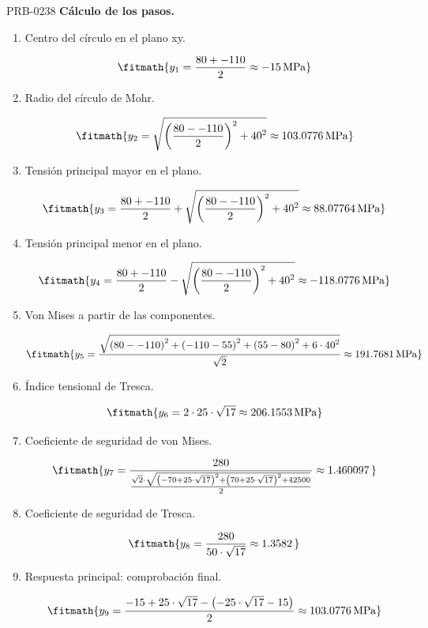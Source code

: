 \begin{studiumworked}{PRB-0238}
\textbf{Cálculo de los pasos.}

\begin{enumerate}

\item Centro del círculo en el plano xy.

\[\fitmath{y_{1}=\frac{80+-110}{2}\approx -15\,\mathrm{MPa}}\]

\item Radio del círculo de Mohr.

\[\fitmath{y_{2}=\sqrt{{\left(\frac{80--110}{2}\right)}^{2}+{40}^{2}}\approx 103.0776\,\mathrm{MPa}}\]

\item Tensión principal mayor en el plano.

\[\fitmath{y_{3}=\frac{80+-110}{2}+\sqrt{{\left(\frac{80--110}{2}\right)}^{2}+{40}^{2}}\approx 88.07764\,\mathrm{MPa}}\]

\item Tensión principal menor en el plano.

\[\fitmath{y_{4}=\frac{80+-110}{2}-\sqrt{{\left(\frac{80--110}{2}\right)}^{2}+{40}^{2}}\approx -118.0776\,\mathrm{MPa}}\]

\item Von Mises a partir de las componentes.

\[\fitmath{y_{5}=\frac{\sqrt{{\left(80--110\right)}^{2}+{\left(-110-55\right)}^{2}+{\left(55-80\right)}^{2}+6\cdot {40}^{2}}}{\sqrt{2}}\approx 191.7681\,\mathrm{MPa}}\]

\item Índice tensional de Tresca.

\[\fitmath{y_{6}=2\cdot 25\cdot \sqrt{17}\approx 206.1553\,\mathrm{MPa}}\]

\item Coeficiente de seguridad de von Mises.

\[\fitmath{y_{7}=\frac{280}{\frac{\sqrt{2}\cdot \sqrt{{\left(-70+25\cdot \sqrt{17}\right)}^{2}+{\left(70+25\cdot \sqrt{17}\right)}^{2}+42500}}{2}}\approx 1.460097\,}\]

\item Coeficiente de seguridad de Tresca.

\[\fitmath{y_{8}=\frac{280}{50\cdot \sqrt{17}}\approx 1.3582\,}\]

\item Respuesta principal: comprobación final.

\[\fitmath{y_{9}=\frac{-15+25\cdot \sqrt{17}-\left(-25\cdot \sqrt{17}-15\right)}{2}\approx 103.0776\,\mathrm{MPa}}\]


\end{enumerate}
\end{studiumworked}
